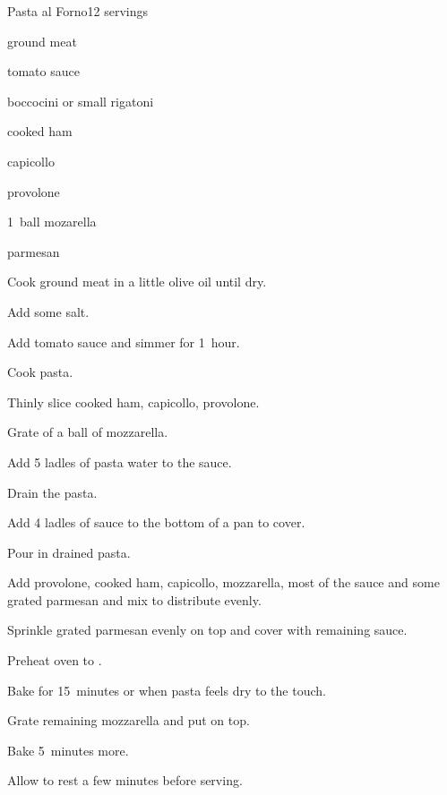 \begin{recipe}{Pasta al Forno}{}{12 servings}

\begin{ingredients}
\item \lbs{1\half} ground meat
\item {} tomato sauce
\item {} boccocini or small rigatoni
\item {} cooked ham
\item {} capicollo
\item {} provolone
\item 1~ball mozarella
\item parmesan
\end{ingredients}

\begin{directions}
\item Cook ground meat in a little olive oil until dry.
\item Add some salt.
\item Add tomato sauce and simmer for 1~hour.
\item Cook pasta.
\item Thinly slice cooked ham, capicollo, provolone.
\item Grate \threequarter{} of a ball of mozzarella.
\item Add 5 ladles of pasta water to the sauce.
\item Drain the pasta.
\item Add 4 ladles of sauce to the bottom of a pan to cover.
\item Pour in drained pasta.
\item Add provolone, cooked ham, capicollo, mozzarella, most of the sauce and some grated parmesan and mix to distribute evenly.
\item Sprinkle grated parmesan evenly on top and cover with remaining sauce.
\item Preheat oven to .
\item Bake for 15~minutes or when pasta feels dry to the touch.
\item Grate remaining mozzarella and put on top.
\item Bake 5~minutes more.
\item Allow to rest a few minutes before serving.
\end{directions}

\end{recipe}
